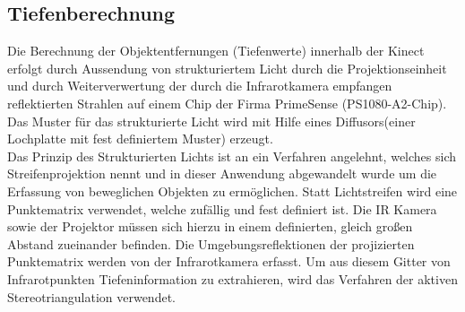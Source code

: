 \subsection{Tiefenberechnung}

Die Berechnung der Objektentfernungen (Tiefenwerte) innerhalb der Kinect erfolgt durch Aussendung von strukturiertem Licht durch die Projektionseinheit und durch Weiterverwertung  der durch die Infrarotkamera empfangen reflektierten Strahlen auf einem Chip der Firma PrimeSense (PS1080-A2-Chip). Das Muster für das strukturierte Licht wird mit Hilfe eines Diffusors(einer Lochplatte mit fest definiertem Muster) erzeugt.\\
Das Prinzip des Strukturierten Lichts ist an ein Verfahren angelehnt, welches sich Streifenprojektion nennt und in dieser Anwendung abgewandelt wurde um die Erfassung von beweglichen Objekten zu ermöglichen. Statt Lichtstreifen wird eine Punktematrix verwendet, welche zufällig und fest definiert ist. Die IR Kamera sowie der Projektor müssen sich hierzu in einem definierten, gleich großen Abstand zueinander befinden.
Die Umgebungsreflektionen der projizierten Punktematrix werden von der Infrarotkamera erfasst.
Um aus diesem Gitter von Infrarotpunkten Tiefeninformation zu extrahieren, wird das Verfahren der aktiven Stereotriangulation verwendet.\\


